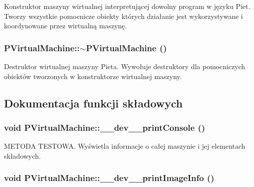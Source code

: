 Konstruktor maszyny wirtualnej interpretującej dowolny program w języku Piet. Tworzy wszystkie pomocnicze obiekty których działanie jest wykorzystywane i koordynowane przez wirtualną maszynę. \hypertarget{classPVirtualMachine_4b24d240f1a45515cf4c8d4df932da62}{
\subsubsection[{$\sim$PVirtualMachine}]{\setlength{\rightskip}{0pt plus 5cm}PVirtualMachine::$\sim$PVirtualMachine ()}}
\label{classPVirtualMachine_4b24d240f1a45515cf4c8d4df932da62}


Destruktor wirtualnej maszyny Pieta. Wywołuje destruktory dla pomocniczych obiektów tworzonych w konstruktorze wirtualnej maszyny. 

\subsection{Dokumentacja funkcji składowych}
\hypertarget{classPVirtualMachine_9fbb7c0313e22051eebfd2e316ec609b}{
\subsubsection[{\_\-\_\-dev\_\-\_\-printConsole}]{\setlength{\rightskip}{0pt plus 5cm}void PVirtualMachine::\_\-\_\-dev\_\-\_\-printConsole ()}}
\label{classPVirtualMachine_9fbb7c0313e22051eebfd2e316ec609b}


METODA TESTOWA. Wyświetla informacje o całej maszynie i jej elementach składowych. \hypertarget{classPVirtualMachine_d0ac4994cbf5c218a40442df49a3cd29}{
\subsubsection[{\_\-\_\-dev\_\-\_\-printImageInfo}]{\setlength{\rightskip}{0pt plus 5cm}void PVirtualMachine::\_\-\_\-dev\_\-\_\-printImageInfo ()}}
\label{classPVirtualMachine_d0ac4994cbf5c218a40442df49a3cd29}


